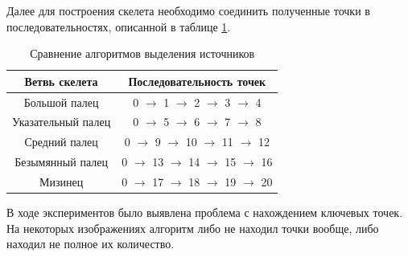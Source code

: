 Далее для построения скелета необходимо соединить полученные точки в последовательностях, описанной в таблице \ref{tab:keypoints_skeleton}.

\begin{table}[h]
	\caption{\label{tab:keypoints_skeleton}Сравнение алгоритмов выделения источников}
	\begin{center}
		\begin{tabular}{|c|c|}
			\hline
			Ветвь скелета & Последовательность точек \\
			\hline
			Большой палец & 0 $\rightarrow$ 1 $\rightarrow$ 2 $\rightarrow$ 3 $\rightarrow$ 4 \\
			Указательный палец & 0 $\rightarrow$ 5 $\rightarrow$ 6 $\rightarrow$ 7 $\rightarrow$ 8 \\
			Средний палец & 0 $\rightarrow$ 9 $\rightarrow$ 10 $\rightarrow$ 11 $\rightarrow$ 12 \\
			Безымянный палец & 0 $\rightarrow$ 13 $\rightarrow$ 14 $\rightarrow$ 15 $\rightarrow$ 16 \\
			Мизинец & 0 $\rightarrow$ 17 $\rightarrow$ 18 $\rightarrow$ 19 $\rightarrow$ 20 \\
			\hline
		\end{tabular}
	\end{center}
\end{table} 

В ходе экспериментов было выявлена проблема с нахождением ключевых точек. На некоторых изображениях алгоритм либо не находил точки вообще, либо находил не полное их количество.